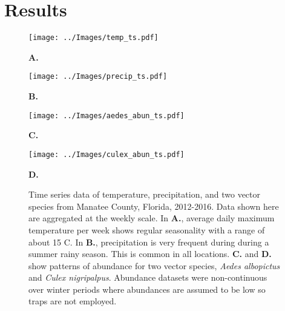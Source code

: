 \section{Results}


\begin{figure}[h!]

		\begin{minipage}[]{.48\textwidth}
			\texttt{[image: ../Images/temp\_ts.pdf]}
			
			\hspace{4.3cm}\textbf{A.}\\
		\end{minipage}
		\begin{minipage}[]{.52\textwidth}
			\texttt{[image: ../Images/precip\_ts.pdf]}
			
			\hspace{4.4cm}\textbf{B.}\\
		\end{minipage}
	
	
		\begin{minipage}[]{.5\textwidth}
			\texttt{[image: ../Images/aedes\_abun\_ts.pdf]}
			
			\hspace{4.3cm}\textbf{C.}\\
		\end{minipage}
		\begin{minipage}[]{.5\textwidth}
			\texttt{[image: ../Images/culex\_abun\_ts.pdf]}
			
			\hspace{4.5cm}\textbf{D.}\\
		\end{minipage}
		
	\label{fig: ts_plots}
	\caption{Time series data of temperature, precipitation, and two vector species from Manatee County, Florida, 2012-2016. Data shown here are aggregated at the weekly scale. In \textbf{A.}, average daily maximum temperature per week shows regular seasonality with a range of about 15 \degree C. In \textbf{B.}, precipitation is very frequent during during a summer rainy season. This is common in all locations. \textbf{C.} and \textbf{D.} show patterns of abundance for two vector species, \textit{Aedes albopictus} and \textit{Culex nigripalpus}. Abundance datasets were non-continuous over winter periods where abundances are assumed to be low so traps are not employed.}

\end{figure}

